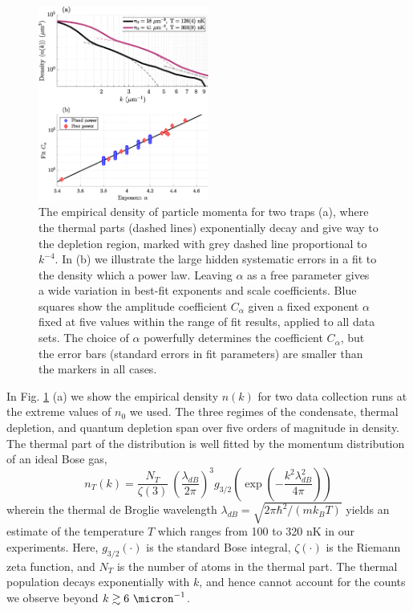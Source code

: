 	\begin{figure}[t]
	        \includegraphics[width=0.5\textwidth]{fig/depletion/exp_density}
	        \caption{The empirical density of particle momenta for two traps (a), where the thermal parts (dashed lines) exponentially decay and give way to the depletion region, marked with grey dashed line proportional to $k^{-4}$.
	        In (b) we illustrate the large hidden systematic errors in a fit to the density which a power law.
	Leaving $\alpha$ as a free parameter gives a wide variation in best-fit exponents and scale coefficients.
	Blue squares show the amplitude coefficient $C_\alpha$ given a fixed exponent $\alpha$ fixed at five values within the range of fit results, applied to all data sets.
	The choice of $\alpha$ powerfully determines the coefficient $C_\alpha$, but the error bars (standard errors in fit parameters) are smaller than the markers in all cases.}
	        \label{fig:contact_determination_issues}
	\end{figure}


	In Fig.
	\ref{fig:contact_determination_issues} (a) we show the empirical density $n(k)$ for two data collection runs at the extreme values of $n_0$ we used.
	The three regimes of the condensate, thermal depletion, and quantum depletion span over five orders of magnitude in density.
	The thermal part of the distribution is well fitted by the momentum distribution of an ideal Bose gas,
	\begin{equation}
		n_T(k) =\frac{N_T}{\zeta(3)} ~\left(\frac{\lambda_{dB}}{2\pi}\right)^3 g_{3/2}\left(\exp\left(-\frac{k^2 \lambda_{dB}^2}{4\pi}\right)\right)
		\label{eqn:th_fun}
	\end{equation}
	wherein the thermal de Broglie wavelength $\lambda_{dB} = \sqrt{2\pi\hbar^2/(m k_B T)}$  yields an estimate of the temperature $T$ which ranges from 100 to 320 nK in our experiments.
	Here, $g_{3/2}(\cdot)$ is the standard Bose integral, $\zeta(\cdot)$ is the Riemann zeta function, and $N_T$ is the number of atoms in the thermal part.
	The thermal population decays exponentially with $k$, and hence cannot account for the counts we observe beyond $k\gtrsim 6~\micron^{-1}$.
	
